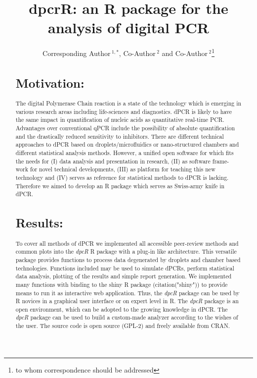 \documentclass{bioinfo}
\begin{document}

\title[dpcR]{dpcrR: an R package for the analysis of digital PCR}
\author[Sample \textit{et~al}]{Corresponding Author\,$^{1,*}$, Co-Author\,$^{2}$ and Co-Author\,$^2$\footnote{to whom correspondence should be addressed}}
\address{$^{1}$Department of XXXXXXX, Address XXXX etc.\\
$^{2}$Department of XXXXXXXX, Address XXXX etc.}



\maketitle

\begin{abstract}

\section{Motivation:}
The digital Polymerase Chain reaction is a state of the technology which is 
emerging in various research areas including life-sciences and diagnostics. dPCR 
is likely to have the same impact in quantification of nucleic acids as 
quantitative real-time PCR. Advantages over conventional qPCR include the 
possibility of absolute quantification and the drastically reduced sensitivity 
to inhibitors. There are different technical approaches to dPCR based on 
droplets/microfluidics or nano-structured chambers and different statistical 
analysis methods. However, a unified open software for which fits the needs for  
(I) data analysis and presentation in research, (II) as software frame-work for 
novel technical developments, (III) as platform for teaching this new technology 
and (IV) serves as reference for statistical methods to dPCR is lacking. 
Therefore we aimed to develop an R package which serves as Swiss-army knife in 
dPCR.
\section{Results:}
To cover all methods of dPCR we implemented all accessible peer-review methods 
and common plots into the \textit{dpcR} R package with a plug-in like architecture. This 
versatile package provides functions to process data degenerated by droplets and 
chamber based technologies. Functions included may be used to simulate dPCRs, 
perform statistical data analysis, plotting of the results and simple report 
generation. We implemented many functions with binding to the shiny R package 
(citation("shiny")) to provide means to run it as interactive web application. 
Thus, the \textit{dpcR} package can be used by R novices in a graphical user interface or 
on expert level in R. The \textit{dpcR} package is an open environment, which can be 
adopted to the growing knowledge in dPCR. The \textit{dpcR} package can be used to build 
a custom-made analyzer according to the wishes of the user. The source code is 
open source (GPL-2) and freely available from CRAN.


\end{abstract}
\end{document}
